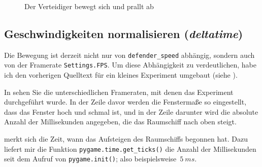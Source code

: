 
\begin{figure}[H]
\begin{center}
\caption{Der Verteidiger bewegt sich und prallt ab}\label{picBewegung01}
\end{center}
\end{figure}

\subsection{Geschwindigkeiten normalisieren (\emph{deltatime})}
Die Bewegung ist derzeit nicht nur von \texttt{defender\_speed} abhängig, sondern auch von der Framerate \texttt{Settings.FPS}. Um diese Abhängigkeit zu verdeutlichen, habe ich den vorherigen Quelltext für ein kleines Experiment umgebaut (siehe ).

In  sehen Sie die unterschiedlichen Frameraten, mit denen das Experiment durchgeführt wurde. In der Zeile davor werden die Fenstermaße so eingestellt, dass das Fenster hoch und schmal ist, und in der Zeile darunter wird die absolute Anzahl der Millisekunden angegeben, die das Raumschiff nach oben steigt.

 merkt sich die Zeit, wann das Aufsteigen des Raumschiffs begonnen hat. Dazu liefert mir die Funktion \texttt{pygame.time.get\_ticks()} die Anzahl der Millisekunden seit dem Aufruf von \texttt{pygame.init()}; also beispielsweise~$5~ms$.

